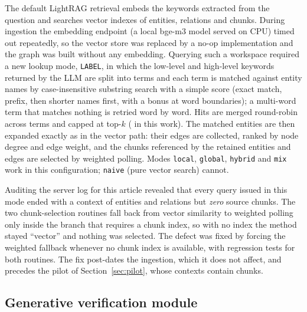 \documentclass[lettersize,journal]{IEEEtran}
\begin{document}
The default LightRAG retrieval embeds the keywords extracted from the question and searches vector indexes of entities, relations and chunks. During ingestion the embedding endpoint (a local bge-m3 model served on CPU) timed out repeatedly, so the vector store was replaced by a no-op implementation and the graph was built without any embedding. Querying such a workspace required a new lookup mode, \texttt{LABEL}, in which the low-level and high-level keywords returned by the LLM are split into terms and each term is matched against entity names by case-insensitive substring search with a simple score (exact match, prefix, then shorter names first, with a bonus at word boundaries); a multi-word term that matches nothing is retried word by word. Hits are merged round-robin across terms and capped at top-$k$ (\topK{} in this work). The matched entities are then expanded exactly as in the vector path: their edges are collected, ranked by node degree and edge weight, and the chunks referenced by the retained entities and edges are selected by weighted polling. Modes \texttt{local}, \texttt{global}, \texttt{hybrid} and \texttt{mix} work in this configuration; \texttt{naive} (pure vector search) cannot.

Auditing the server log for this article revealed that every query issued in this mode ended with a context of entities and relations but \emph{zero} source chunks. The two chunk-selection routines fall back from vector similarity to weighted polling only inside the branch that requires a chunk index, so with no index the method stayed ``vector'' and nothing was selected. The defect was fixed by forcing the weighted fallback whenever no chunk index is available, with regression tests for both routines. The fix post-dates the ingestion, which it does not affect, and precedes the pilot of Section~\ref{sec:pilot}, whose contexts contain chunks.

\subsection{Generative verification module}
\label{sec:verifier}
\end{document}

